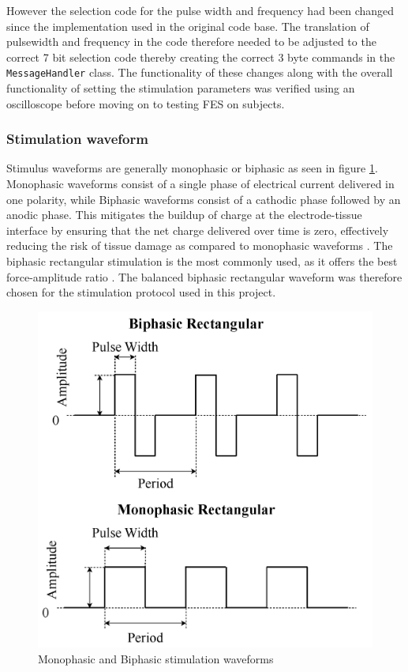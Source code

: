 However the selection code for the pulse width and frequency had been changed since the implementation used in the original code base. The translation of pulsewidth and frequency in the code therefore needed to be adjusted to the correct 7 bit selection code thereby creating the correct 3 byte commands in the \texttt{MessageHandler} class. The functionality of these changes along with the overall functionality of setting the stimulation parameters was verified using an oscilloscope before moving on to testing FES on subjects. 


\subsubsection{Stimulation waveform}
Stimulus waveforms are generally monophasic or biphasic as seen in figure \ref{fig:twowave}. Monophasic waveforms consist of a single phase of electrical current delivered in one polarity, while Biphasic waveforms consist of a cathodic phase followed by an anodic phase. This mitigates the buildup of charge at the electrode-tissue interface by ensuring that the net charge delivered over time is zero, effectively reducing the risk of tissue damage as compared to monophasic waveforms \cite{peckham_functional_2005}. The biphasic rectangular stimulation is the most commonly used, as it offers the best force-amplitude ratio \cite{lynch_functional_2008}. The balanced biphasic rectangular waveform was therefore chosen for the stimulation protocol used in this project.
 \begin{figure} [H]
     \centering
     \includegraphics[width=0.6\linewidth]{images/twowaveform.jpg}
     \caption{Monophasic and Biphasic stimulation waveforms}
     \label{fig:twowave}
 \end{figure}
 


